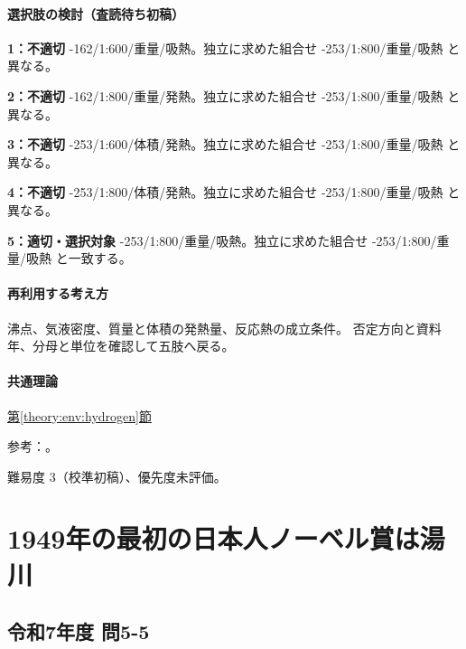 \paragraph{選択肢の検討（査読待ち初稿）}\mbox{}\par

\noindent\textbf{1：不適切} -162/1:600/重量/吸熱。独立に求めた組合せ -253/1:800/重量/吸熱 と異なる。\par

\noindent\textbf{2：不適切} -162/1:800/重量/発熱。独立に求めた組合せ -253/1:800/重量/吸熱 と異なる。\par

\noindent\textbf{3：不適切} -253/1:600/体積/発熱。独立に求めた組合せ -253/1:800/重量/吸熱 と異なる。\par

\noindent\textbf{4：不適切} -253/1:800/体積/発熱。独立に求めた組合せ -253/1:800/重量/吸熱 と異なる。\par

\noindent\textbf{5：適切・選択対象} -253/1:800/重量/吸熱。独立に求めた組合せ -253/1:800/重量/吸熱 と一致する。\par

\paragraph{再利用する考え方} 沸点、気液密度、質量と体積の発熱量、反応熱の成立条件。 否定方向と資料年、分母と単位を確認して五肢へ戻る。

\paragraph{共通理論} \hyperref[theory:env:hydrogen]{第\ref*{theory:env:hydrogen}節}

\par 参考：\cite{env60_hydrogen}。

\par 難易度 3（校準初稿）、優先度未評価。

\section{1949年の最初の日本人ノーベル賞は湯川}

\subsection{令和7年度 問5-5}
\label{q:r07-reg-basic-5-5}

